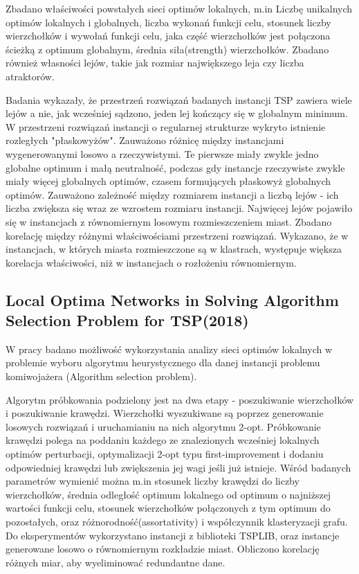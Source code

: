 Zbadano właściwości powstałych sieci optimów lokalnych, m.in
Liczbę unikalnych optimów lokalnych i globalnych, liczba wykonań funkcji celu,
stosunek liczby wierzchołków i wywołań funkcji celu, jaka część wierzchołków jest połączona ścieżką
z optimum globalnym, średnia siła(strength) wierzchołków.
Zbadano również własności lejów, takie jak rozmiar największego leja czy liczba atraktorów.

Badania wykazały, że przestrzeń rozwiązań badanych instancji TSP zawiera wiele lejów a nie, jak wcześniej sądzono,
jeden lej kończący się w globalnym minimum. W przestrzeni rozwiązań instancji o regularnej strukturze
wykryto istnienie rozległych "płaskowyżów". Zauważono różnicę między instancjami wygenerowanymi losowo a rzeczywistymi.
Te pierwsze miały zwykle jedno globalne optimum i małą neutralność, podczas gdy instancje rzeczywiste
zwykle miały więcej globalnych optimów, czasem formujących płaskowyż globalnych optimów.
Zauważono zależność między rozmiarem instancji a liczbą lejów - ich liczba zwiększa się wraz ze wzrostem
rozmiaru instancji. Najwięcej lejów pojawiło się w instancjach z równomiernym losowym rozmieszczeniem miast.
Zbadano korelację między różnymi właściwościami przestrzeni rozwiązań.
Wykazano, że w instancjach, w których miasta rozmieszczone są w klastrach, występuje większa korelacja
właściwości, niż w instancjach o rozłożeniu równomiernym.

\subsection*{Local Optima Networks in Solving Algorithm Selection Problem for TSP(2018)\cite{DBLP:conf/depcos/BozejkoGNAB18}}
W pracy badano możliwość wykorzystania analizy sieci optimów lokalnych w problemie wyboru algorytmu heurystycznego dla danej instancji problemu komiwojażera
(Algorithm selection problem).

Algorytm próbkowania podzielony jest na dwa etapy - poszukiwanie wierzchołków i poszukiwanie krawędzi.
Wierzchołki wyszukiwane są poprzez generowanie losowych rozwiązań i uruchamianiu na nich algorytmu 2-opt.
Próbkowanie krawędzi polega na poddaniu każdego ze znalezionych wcześniej lokalnych optimów perturbacji,
optymalizacji 2-opt typu first-improvement i dodaniu odpowiedniej krawędzi lub zwiększenia jej wagi jeśli już istnieje.
Wśród badanych parametrów wymienić można m.in stosunek liczby krawędzi do liczby wierzchołków,
średnia odległość optimum lokalnego od optimum o najniższej
wartości funkcji celu, stosunek wierzchołków połączonych z tym optimum do pozostałych,
oraz różnorodność(assortativity) i współczynnik klasteryzacji grafu.
Do eksperymentów wykorzystano instancji z biblioteki TSPLIB, oraz instancje generowane losowo
o równomiernym rozkładzie miast.
Obliczono korelację różnych miar, aby wyeliminować redundantne dane.

